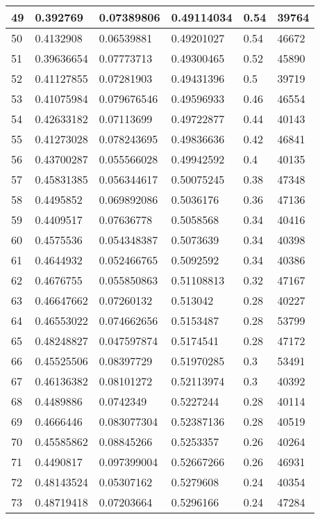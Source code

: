 \begin{longtable}{|l|l|l|l|l|l|}
49 & 0.392769 & 0.07389806 & 0.49114034 & 0.54 & 39764 \\ \hline 
50 & 0.4132908 & 0.06539881 & 0.49201027 & 0.54 & 46672 \\ \hline 
51 & 0.39636654 & 0.07773713 & 0.49300465 & 0.52 & 45890 \\ \hline 
52 & 0.41127855 & 0.07281903 & 0.49431396 & 0.5 & 39719 \\ \hline 
53 & 0.41075984 & 0.079676546 & 0.49596933 & 0.46 & 46554 \\ \hline 
54 & 0.42633182 & 0.07113699 & 0.49722877 & 0.44 & 40143 \\ \hline 
55 & 0.41273028 & 0.078243695 & 0.49836636 & 0.42 & 46841 \\ \hline 
56 & 0.43700287 & 0.055566028 & 0.49942592 & 0.4 & 40135 \\ \hline 
57 & 0.45831385 & 0.056344617 & 0.50075245 & 0.38 & 47348 \\ \hline 
58 & 0.4495852 & 0.069892086 & 0.5036176 & 0.36 & 47136 \\ \hline 
59 & 0.4409517 & 0.07636778 & 0.5058568 & 0.34 & 40416 \\ \hline 
60 & 0.4575536 & 0.054348387 & 0.5073639 & 0.34 & 40398 \\ \hline 
61 & 0.4644932 & 0.052466765 & 0.5092592 & 0.34 & 40386 \\ \hline 
62 & 0.4676755 & 0.055850863 & 0.51108813 & 0.32 & 47167 \\ \hline 
63 & 0.46647662 & 0.07260132 & 0.513042 & 0.28 & 40227 \\ \hline 
64 & 0.46553022 & 0.074662656 & 0.5153487 & 0.28 & 53799 \\ \hline 
65 & 0.48248827 & 0.047597874 & 0.5174541 & 0.28 & 47172 \\ \hline 
66 & 0.45525506 & 0.08397729 & 0.51970285 & 0.3 & 53491 \\ \hline 
67 & 0.46136382 & 0.08101272 & 0.52113974 & 0.3 & 40392 \\ \hline 
68 & 0.4489886 & 0.0742349 & 0.5227244 & 0.28 & 40114 \\ \hline 
69 & 0.4666446 & 0.083077304 & 0.52387136 & 0.28 & 40519 \\ \hline 
70 & 0.45585862 & 0.08845266 & 0.5253357 & 0.26 & 40264 \\ \hline 
71 & 0.4490817 & 0.097399004 & 0.52667266 & 0.26 & 46931 \\ \hline 
72 & 0.48143524 & 0.05307162 & 0.5279608 & 0.24 & 40354 \\ \hline 
73 & 0.48719418 & 0.07203664 & 0.5296166 & 0.24 & 47284 \\ \hline 

\end{longtable}
